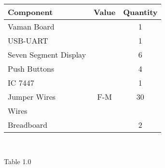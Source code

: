 \centering
\begin{tabular}{|l|c|c|}
\hline
Component & Value & Quantity\\
\hline
Vaman Board & & 1\\
\hline
USB-UART & & 1\\
\hline
Seven Segment Display & & 6\\
\hline
Push Buttons & & 4\\
\hline
IC 7447 &  & 1\\
\hline
Jumper Wires & F-M & 30\\
\hline
Wires &  & \\
\hline
Breadboard & & 2\\
\hline
\end{tabular}\\
\centerline{Table 1.0}
